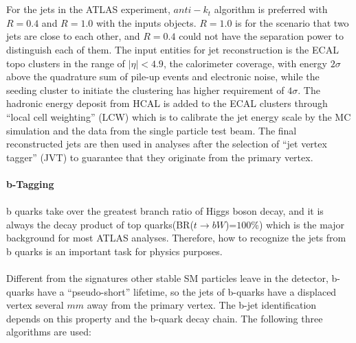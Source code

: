 \\
\\For the jets in the ATLAS experiment, $anti-k_{t}$ algorithm is preferred with $R=0.4$ and $R=1.0$ with the inputs objects. $R=1.0$ is for the scenario that two jets are close to each other, and $R=0.4$ could not have the separation power to distinguish each of them. The input entities for jet reconstruction is the ECAL topo clusters in the range of $|\eta|<4.9$, the calorimeter coverage, with energy $2\sigma$ above the quadrature sum of pile-up events and electronic noise, while the seeding cluster to initiate the clustering has higher requirement of $4\sigma$. The hadronic energy deposit from HCAL is added to the ECAL clusters through ``local cell weighting'' (LCW)\cite{Barillari:1112035} which is to calibrate the jet energy scale by the MC simulation and the data from the single particle test beam. The final reconstructed jets are then used in analyses after the selection of ``jet vertex tagger'' (JVT)\cite{ATLAS-CONF-2014-018} to guarantee that they originate from the primary vertex. 
\\
\\{\bf b-Tagging\cite{ATL-PHYS-PUB-2015-022}}
\\
\\b quarks take over the greatest branch ratio of Higgs boson decay, and it is always the decay product of top quarks(BR($t \rightarrow bW$)=$100\%$) which is the major background for most ATLAS analyses. Therefore, how to recognize the jets from b quarks is an important task for physics purposes.
\\
\\Different from the signatures other stable SM particles leave in the detector, b-quarks have a ``pseudo-short'' lifetime, so the jets of b-quarks have a displaced vertex several $mm$ away from the primary vertex. The b-jet identification depends on this property and the b-quark decay chain. The following three algorithms are used:
